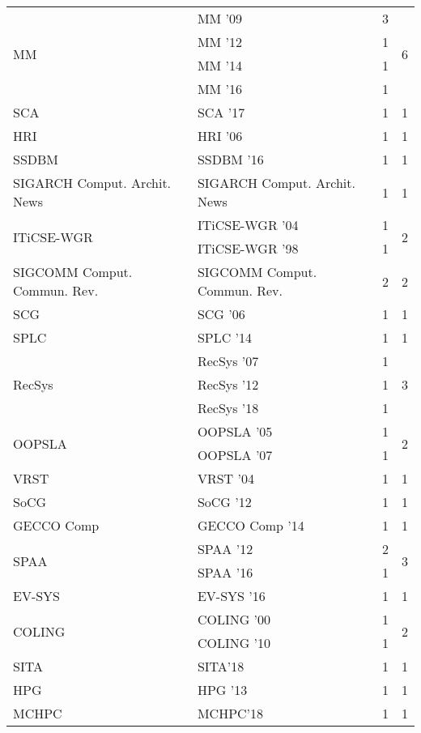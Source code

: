 \begin{table*}[t]
\begin{tabular}{llrr}
\multirow{4}{*}{MM } & MM '09 & 3 & \multirow{4}{*}{6}\\
& MM '12 & 1 &\\
& MM '14 & 1 &\\
& MM '16 & 1 &\\
\multirow{1}{*}{SCA } & SCA '17 & 1 & \multirow{1}{*}{1}\\
\multirow{1}{*}{HRI } & HRI '06 & 1 & \multirow{1}{*}{1}\\
\multirow{1}{*}{SSDBM } & SSDBM '16 & 1 & \multirow{1}{*}{1}\\
\multirow{1}{*}{SIGARCH Comput. Archit. News} & SIGARCH Comput. Archit. News & 1 & \multirow{1}{*}{1}\\
\multirow{2}{*}{ITiCSE-WGR } & ITiCSE-WGR '04 & 1 & \multirow{2}{*}{2}\\
& ITiCSE-WGR '98 & 1 &\\
\multirow{1}{*}{SIGCOMM Comput. Commun. Rev.} & SIGCOMM Comput. Commun. Rev. & 2 & \multirow{1}{*}{2}\\
\multirow{1}{*}{SCG } & SCG '06 & 1 & \multirow{1}{*}{1}\\
\multirow{1}{*}{SPLC } & SPLC '14 & 1 & \multirow{1}{*}{1}\\
\multirow{3}{*}{RecSys } & RecSys '07 & 1 & \multirow{3}{*}{3}\\
& RecSys '12 & 1 &\\
& RecSys '18 & 1 &\\
\multirow{2}{*}{OOPSLA } & OOPSLA '05 & 1 & \multirow{2}{*}{2}\\
& OOPSLA '07 & 1 &\\
\multirow{1}{*}{VRST } & VRST '04 & 1 & \multirow{1}{*}{1}\\
\multirow{1}{*}{SoCG } & SoCG '12 & 1 & \multirow{1}{*}{1}\\
\multirow{1}{*}{GECCO Comp } & GECCO Comp '14 & 1 & \multirow{1}{*}{1}\\
\multirow{2}{*}{SPAA } & SPAA '12 & 2 & \multirow{2}{*}{3}\\
& SPAA '16 & 1 &\\
\multirow{1}{*}{EV-SYS } & EV-SYS '16 & 1 & \multirow{1}{*}{1}\\
\multirow{2}{*}{COLING } & COLING '00 & 1 & \multirow{2}{*}{2}\\
& COLING '10 & 1 &\\
\multirow{1}{*}{SITA} & SITA'18 & 1 & \multirow{1}{*}{1}\\
\multirow{1}{*}{HPG } & HPG '13 & 1 & \multirow{1}{*}{1}\\
\multirow{1}{*}{MCHPC} & MCHPC'18 & 1 & \multirow{1}{*}{1}\\

\end{tabular}
\end{table*}
